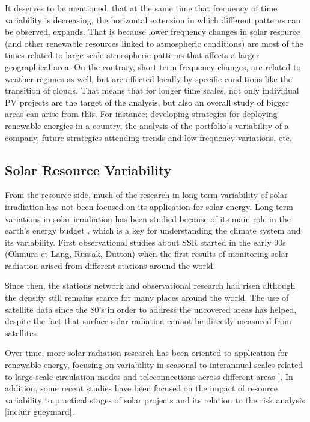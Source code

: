 It deserves to be mentioned, that at the same time that frequency of time variability is decreasing, the horizontal extension in which different patterns can be observed, expands. That is because lower frequency changes in solar resource (and other renewable resources linked to atmospheric conditions) are most of the times related to large-scale atmospheric patterns that affects a larger geographical area. On the contrary, short-term frequency changes, are related to weather regimes as well, but are affected locally by specific conditions like the transition of clouds. That means that for longer time scales, not only individual PV projects are the target of the analysis, but also an overall study of bigger areas can arise from this. For instance: developing strategies for deploying renewable energies in a country, the analysis of the portfolio's variability of a company, future strategies attending trends and low frequency variations, etc. 
  
\subsection{Solar Resource Variability}

From the resource side, much of the research in long-term variability of solar irradiation has not been focused on its application for solar energy. Long-term variations in solar irradiation has been studied because of its main role in the earth's energy budget \cite*{Wild2012}, which is a key for understanding the climate system and its variability. First observational studies about SSR started in the early 90s (Ohmura et Lang, Russak, Dutton) when the first results of monitoring solar radiation arised from different stations around the world.

Since then, the stations network and observational research had risen although the density still remains scarce for many places around the world. The use of satellite data since the 80's in order to address the uncovered areas has helped, despite the fact that surface solar radiation cannot be directly measured from satellites.  

Over time, more solar radiation research has been oriented to application for renewable energy, focusing on variability in seasonal to interannual scales related to large-scale circulation modes and teleconnections across different areas \cite*{Davy2012, Jerez2013, Jerez2013a}].  In addition, some recent studies have been focused on the impact of resource variability to practical stages of solar projects and its relation to the risk analysis \cite*{Bryce2018} [incluir gueymard].

